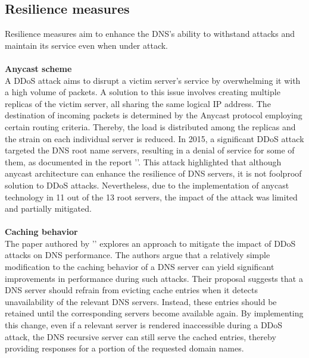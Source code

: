 \subsection{Resilience measures}
Resilience measures aim to enhance the DNS's ability to withstand attacks and maintain its service even when under attack.\\
\\
\textbf{Anycast scheme}\\
A DDoS attack aims to disrupt a victim server's service by overwhelming it with a high volume of packets. A solution to this issue involves 
creating multiple replicas of the victim server, all sharing the same logical IP address. The destination of 
incoming packets is determined by the Anycast protocol employing certain routing criteria. Thereby, the load is distributed among the replicas 
and the strain on each individual server is reduced.
In 2015, a significant DDoS attack targeted the DNS root name servers, resulting in a denial of service for some of them, as documented in the report '\cite{anycast}'. 
This attack highlighted that although anycast architecture can enhance the resilience of DNS servers, it is not foolproof solution to DDoS attacks. 
Nevertheless, due to the implementation of anycast technology in 11 out of the 13 root servers, the impact of the attack was limited and partially mitigated.\\
\\
\textbf{Caching behavior}\\
The paper authored by '\cite{alleviatingimpact}' explores an approach to mitigate the impact of DDoS attacks on DNS performance. 
The authors argue that a relatively simple modification to the caching behavior of a DNS server can yield significant 
improvements in performance during such attacks.
Their proposal suggests that a DNS server should refrain from evicting cache entries when it detects unavailability of the relevant DNS servers. 
Instead, these entries should be retained until the corresponding servers become available again. By implementing this change, even if a relevant 
server is rendered inaccessible during a DDoS attack, the DNS recursive server can still serve the cached entries, thereby providing responses for 
a portion of the requested domain names.


